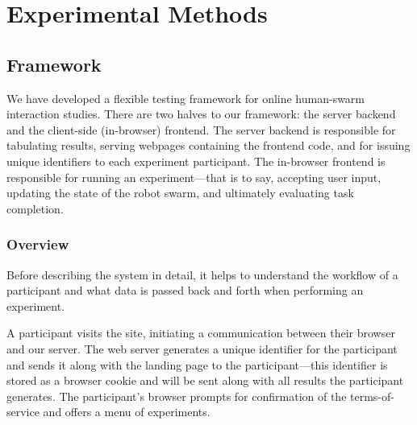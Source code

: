\section{Experimental Methods}
\label{sec:expMethods}


\subsection{Framework}

We have developed a flexible testing framework for online human-swarm interaction studies. There are two halves to our framework: the server backend and the client-side (in-browser) frontend. The server backend is responsible for tabulating results, serving webpages containing the frontend code, and for issuing unique identifiers to each experiment participant. The in-browser frontend is responsible for running an experiment---that is to say, accepting user input, updating the state of the robot swarm, and ultimately evaluating task completion.

\subsubsection{Overview}

Before describing the system in detail, it helps to understand the workflow of a participant and what data is passed back and forth when performing an experiment.

A participant visits the site, initiating a communication between their browser and our server. The web server generates a unique identifier for the participant and sends it along with the landing page to the participant---this identifier is stored as a browser cookie and will be sent along with all results the participant generates. The participant's browser prompts for confirmation of the terms-of-service and offers a menu of experiments.

